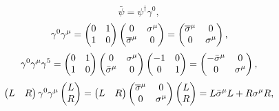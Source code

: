 \documentclass{article}
\theoremstyle{plain}
\theoremstyle{definition}
\begin{document}
	\[\bar{\psi} =\psi^\dagger\gamma^0, \]
	\[\gamma^0\gamma^{\mu} = \left(\begin{array}{@{}cc@{}}
	0 & 1\\
	1 & 0 
	\end{array}\right) \left(\begin{array}{@{}cc@{}}
	0 & \sigma^{\mu}\\
	\overline{\sigma}^{\mu} & 0 
	\end{array}\right) = \left(\begin{array}{@{}cc@{}}
	\overline{\sigma}^{\mu} & 0\\
	0 & \sigma^{\mu} 
	\end{array}\right),  \]
	\[\gamma^0\gamma^{\mu}\gamma^5 = \left(\begin{array}{@{}cc@{}}
	0 & 1\\
	1 & 0 
	\end{array}\right) \left(\begin{array}{@{}cc@{}}
	0 & \sigma^{\mu}\\
	\bar{\sigma}^{\mu} & 0 
	\end{array}\right)
	\left(\begin{array}{@{}cc@{}}
	-1 & 0\\
	0 & 1 
	\end{array}\right) = \left(\begin{array}{@{}cc@{}}
	-\bar{\sigma}^{\mu} & 0\\
	0 & \sigma^{\mu} 
	\end{array}\right),
	\]
	\begin{equation}\label{WeylEspinors1}
	\left(\begin{array}{@{}cc@{}}
	L&
	R 
	\end{array}\right)
	\gamma^0\gamma^\mu \left(\begin{array}{@{}c@{}}
	L\\
	R
	\end{array}\right) = \left(\begin{array}{@{}cc@{}}
	L&
	R 
	\end{array}\right)
\left(\begin{array}{@{}cc@{}}
\overline{\sigma}^{\mu} & 0\\
0 & \sigma^{\mu} 
\end{array}\right)
	\left(\begin{array}{@{}c@{}}
	L\\
	R
	\end{array}\right) = L\bar{\sigma}^{\mu}L + R\sigma^{\mu}R,
	\end{equation}
\end{document}
